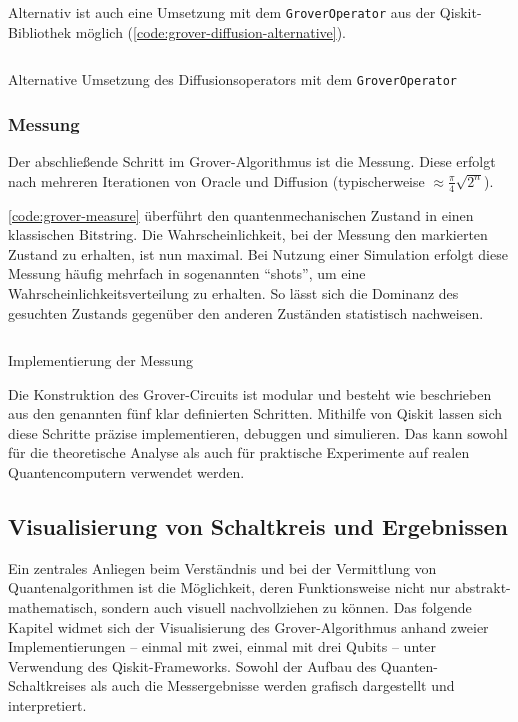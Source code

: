 Alternativ ist auch eine Umsetzung mit dem \texttt{GroverOperator} aus der Qiskit-Bibliothek möglich (\autoref{code:grover-diffusion-alternative}).

\begin{listing}[ht!]
  \inputminted{python}{code/quantum-software/grover-diffusion-alternative.py}
  \caption{Alternative Umsetzung des Diffusionsoperators mit dem \texttt{GroverOperator}}
  \label{code:grover-diffusion-alternative}
\end{listing}

\subsubsection*{Messung}

Der abschließende Schritt im Grover-Algorithmus ist die Messung. Diese erfolgt nach mehreren Iterationen von Oracle und Diffusion (typischerweise $\approx \frac{\pi}{4} \sqrt{2^n}$).

\autoref{code:grover-measure} überführt den quantenmechanischen Zustand in einen klassischen Bitstring. Die Wahrscheinlichkeit, bei der Messung den markierten Zustand zu erhalten, ist nun maximal. Bei Nutzung einer Simulation erfolgt diese Messung häufig mehrfach in sogenannten \enquote{shots}, um eine Wahrscheinlichkeitsverteilung zu erhalten. So lässt sich die Dominanz des gesuchten Zustands gegenüber den anderen Zuständen statistisch nachweisen.

\begin{listing}[ht!]
  \inputminted{python}{code/quantum-software/grover-measure.py}
  \caption{Implementierung der Messung}
  \label{code:grover-measure}
\end{listing}
 
Die Konstruktion des Grover-Circuits ist modular und besteht wie beschrieben aus den genannten fünf klar definierten Schritten. Mithilfe von Qiskit lassen sich diese Schritte präzise implementieren, debuggen und simulieren. Das kann sowohl für die theoretische Analyse als auch für praktische Experimente auf realen Quantencomputern verwendet werden. \autocite{ibm_quantum_2025} \autocite{javadi-abhari_grovers_2023}

\subsection{Visualisierung von Schaltkreis und Ergebnissen}

Ein zentrales Anliegen beim Verständnis und bei der Vermittlung von Quantenalgorithmen ist die Möglichkeit, deren Funktionsweise nicht nur abstrakt-mathematisch, sondern auch visuell nachvollziehen zu können. Das folgende Kapitel widmet sich der Visualisierung des Grover-Algorithmus anhand zweier Implementierungen – einmal mit zwei, einmal mit drei Qubits – unter Verwendung des Qiskit-Frameworks. Sowohl der Aufbau des Quanten-Schaltkreises als auch die Messergebnisse werden grafisch dargestellt und interpretiert.


